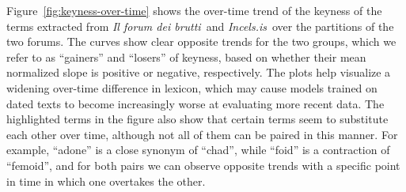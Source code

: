 \documentclass[11pt]{article}
\newcommand{\enforum}{\textit{Incels.is}}
\newcommand{\itforum}{\textit{Il forum dei brutti}}
\begin{document}


Figure~\ref{fig:keyness-over-time} shows the over-time trend of the keyness of the terms extracted from \itforum\, and \enforum\, over the partitions of the two forums. The curves show clear opposite trends for the two groups, which we refer to as ``gainers'' and ``losers'' of keyness, based on whether their mean normalized slope is positive or negative, respectively. The plots help visualize a widening over-time difference in lexicon, which may cause models trained on dated texts to become increasingly worse at evaluating more recent data. The highlighted terms in the figure also show that certain terms seem to substitute each other over time, although not all of them can be paired in this manner. For example, ``adone'' is a close synonym of ``chad'', while ``foid'' is a contraction of ``femoid'', and for both pairs we can observe opposite trends with a specific point in time in which one overtakes the other.
\end{document}
